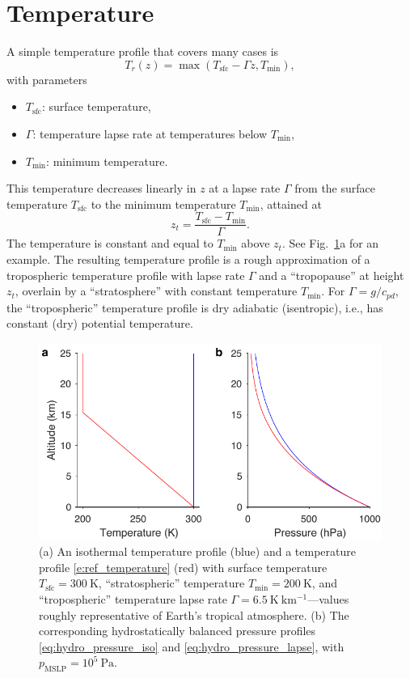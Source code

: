 \documentclass{report}
\begin{document}
\section{Temperature}

A simple temperature profile that covers many cases is
\begin{equation}\label{e:ref_temperature}
    T_r(z) = \max \left( T_{\mathrm{sfc}} - \Gamma z, T_{\min} \right),
\end{equation}
with parameters
\begin{itemize}
    \item $T_{\mathrm{sfc}}$: surface temperature, 
    \item $\Gamma$: temperature lapse rate at temperatures below $T_{\min}$,
    \item $T_{\min}$: minimum temperature.
\end{itemize}
This temperature decreases linearly in $z$ at a lapse rate $\Gamma$ from the surface temperature $T_{\mathrm{sfc}}$ to the minimum temperature $T_{\min}$, attained at 
\begin{equation}\label{e:z_t}
z_{t} = \frac{T_{\mathrm{sfc}} - T_{\min}}{\Gamma}.
\end{equation}
The temperature is constant and equal to $T_{\min}$ above $z_t$. See Fig.~\ref{f:hydrostatic_state}a for an example. The resulting temperature profile is a rough approximation of a tropospheric temperature profile with lapse rate $\Gamma$ and a ``tropopause'' at height $z_t$, overlain by a ``stratosphere'' with constant temperature $T_{\min}$. For $\Gamma = g/c_{pd}$, the ``tropospheric'' temperature profile is dry adiabatic (isentropic), i.e., has constant (dry) potential temperature. 
\begin{figure}
    \centering
    \includegraphics{figures/hydrostatic_state.pdf}
    \caption{(a) An isothermal temperature profile (blue) and a temperature profile \eqref{e:ref_temperature} (red) with surface temperature $T_{\mathrm{sfc}} = 300~\mathrm{K}$, ``stratospheric'' temperature $T_{\min} = 200~\mathrm{K}$, and ``tropospheric'' temperature lapse rate $\Gamma = 6.5~\mathrm{K~km^{-1}}$---values roughly representative of Earth's tropical atmosphere. (b) The corresponding hydrostatically balanced pressure profiles \eqref{eq:hydro_pressure_iso} and \eqref{eq:hydro_pressure_lapse}, with $p_{\mathrm{MSLP}} = 10^5~\mathrm{Pa}$.}
    \label{f:hydrostatic_state}
\end{figure}
\end{document}
